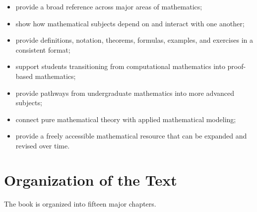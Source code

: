 \begin{itemize}

    \item provide a broad reference across major areas of mathematics;

    \item show how mathematical subjects depend on and interact with one
          another;

    \item provide definitions, notation, theorems, formulas, examples,
          and exercises in a consistent format;

    \item support students transitioning from computational mathematics
          into proof-based mathematics;

    \item provide pathways from undergraduate mathematics into more
          advanced subjects;

    \item connect pure mathematical theory with applied mathematical
          modeling;

    \item provide a freely accessible mathematical resource that can be
          expanded and revised over time.

\end{itemize}

\section*{Organization of the Text}

The book is organized into fifteen major chapters.

